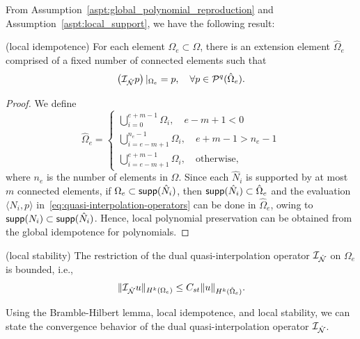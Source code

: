 From Assumption~\ref{aspt:global_polynomial_reproduction} and Assumption~\ref{aspt:local_support}, we have the following result:
\begin{lemma}\label{lemma:local_polynomial_reproduction}
	(local idempotence) For each element $\Omega_e\subset\Omega$, there is an extension element $\hat{\Omega}_e$ comprised of a fixed number of connected elements such that
	\begin{equation}
		\left(\mathcal{I}_{\hat{\mathcal{N}}}p\right)\vert_{\Omega_e}=p,\quad\forall{}p\in\mathcal{P}^q{(\hat{\Omega}_e)}.
	\end{equation}
	\begin{proof}
		We define
		\begin{equation}
			\hat{\Omega}_e=
			\begin{cases}
				\bigcup_{i=0}^{e+m-1}\Omega_i,\quad{e-m+1<0}         \\
				\bigcup_{i=e-m+1}^{n_e-1}\Omega_i,\quad{e+m-1>n_e-1} \\
				\bigcup_{i=e-m+1}^{e+m-1}\Omega_i,\quad\text{otherwise},
			\end{cases}
		\end{equation}
		where $n_e$ is the number of elements in $\Omega$. Since each $\hat{N}_i$ is supported by at most $m$ connected elements, if $\Omega_e\subset\mathop{\mathsf{supp}}(\hat{N}_i)$, then $\mathop{\mathsf{supp}}(\hat{N}_i)\subset\hat{\Omega}_e$ and the evaluation $\langle{N_i,p}\rangle$ in~\eqref{eq:quasi-interpolation-operators} can be done in $\hat{\Omega}_e$, owing to $\mathop{\mathsf{supp}}({N}_i)\subset\mathop{\mathsf{supp}}(\hat{N}_i)$. Hence, local polynomial preservation can be obtained from the global idempotence for polynomials.
	\end{proof}
\end{lemma}

\begin{assumption}\label{aspt:local_stability}
	(local stability) The restriction of the dual quasi-interpolation operator $\mathcal{I}_{\hat{\mathcal{N}}}$ on $\Omega_e$ is bounded, i.e.,
	\begin{equation}
		\|\mathcal{I}_{\hat{\mathcal{N}}}u\|_{H^k(\Omega_e)}\leq{}C_{st}\|u\|_{H^k(\hat{\Omega}_e)}.
	\end{equation}
\end{assumption}

Using the Bramble-Hilbert lemma, local idempotence, and local stability, we can state the convergence behavior of the dual quasi-interpolation operator $\mathcal{I}_{\hat{\mathcal{N}}}$.

